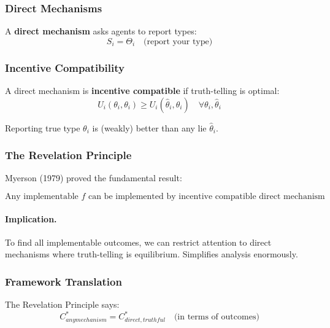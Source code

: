 \subsubsection{Direct Mechanisms}

A \textbf{direct mechanism} asks agents to report types:
\begin{equation}
S_i = \Theta_i \quad \text{(report your type)}
\end{equation}

\subsubsection{Incentive Compatibility}

A direct mechanism is \textbf{incentive compatible} if truth-telling is optimal:
\begin{equation}
\boxed{
U_i(\theta_i, \theta_i) \geq U_i(\hat{\theta}_i, \theta_i) \quad \forall \theta_i, \hat{\theta}_i
}
\label{eq:ic}
\end{equation}

Reporting true type $\theta_i$ is (weakly) better than any lie $\hat{\theta}_i$.

\subsubsection{The Revelation Principle}

Myerson (1979) proved the fundamental result:

\begin{equation}
\boxed{
\text{Any implementable } f \text{ can be implemented by incentive compatible direct mechanism}
}
\label{eq:revelation}
\end{equation}

\paragraph{Implication.}
To find all implementable outcomes, we can restrict attention to direct 
mechanisms where truth-telling is equilibrium. Simplifies analysis enormously.

\subsubsection{Framework Translation}

The Revelation Principle says:
\begin{equation}
C^*_{any mechanism} = C^*_{direct, truthful} \quad \text{(in terms of outcomes)}
\end{equation}

